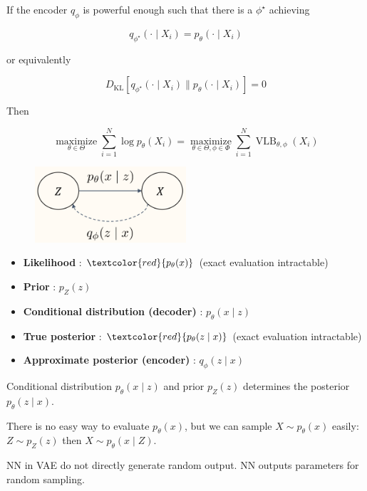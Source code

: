 \begin{concept}
    If the encoder $q_{\phi}$ is powerful enough such that there is a $\phi^{\star}$ achieving

    $$
    q_{\phi^{\star}}\left(\cdot \mid X_{i}\right)=p_{\theta}\left(\cdot \mid X_{i}\right)
    $$

    or equivalently

    $$
    D_{\mathrm{KL}}\left[q_{\phi^{\star}}\left(\cdot \mid X_{i}\right) \| p_{\theta}\left(\cdot \mid X_{i}\right)\right]=0
    $$

    Then

    $$
    \underset{\theta \in \Theta}{\operatorname{maximize}} \sum_{i=1}^{N} \log p_{\theta}\left(X_{i}\right)=\underset{\theta \in \Theta, \phi \in \Phi}{\operatorname{maximize}} \sum_{i=1}^{N} \operatorname{VLB}_{\theta, \phi}\left(X_{i}\right)
    $$
\end{concept}

\begin{definition}
    \begin{figure}[H]
        \centering
        \includegraphics[width=0.5\textwidth]{.././assets/11.4.png}
    \end{figure}

    \begin{itemize}
        \item \textbf{Likelihood} : $\textcolor{red}{p_{\theta}(x)}$ (exact evaluation intractable)
        \item \textbf{Prior} : $p_{Z}(z)$
        \item \textbf{Conditional distribution (decoder)} : $p_{\theta}(x \mid z)$
        \item \textbf{True posterior} : $\textcolor{red}{p_{\theta}(z \mid x)}$ (exact evaluation intractable)
        \item \textbf{Approximate posterior (encoder)} : $q_{\phi}(z \mid x)$
    \end{itemize}

    \par\noindent\textcolor{gray}{\hdashrule{\textwidth}{0.4pt}{1pt 2pt}}

    Conditional distribution $p_{\theta}(x \mid z)$ and prior $p_{Z}(z)$ determines the posterior $p_{\theta}(z \mid x)$.

    There is no easy way to evaluate $p_{\theta}(x)$, but we can sample $X \sim p_{\theta}(x)$ easily: $Z \sim p_{Z}(z)$ then $X \sim p_{\theta}(x \mid Z)$.

    NN in VAE do not directly generate random output. NN outputs parameters for random sampling.
\end{definition}

